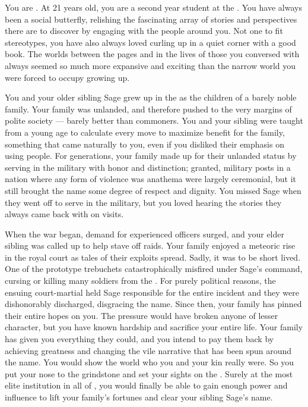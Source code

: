 \documentclass[char]{GL2020}
\begin{document}
\name{\cLibAssist{}}

You are \cLibAssist{\intro}. At 21 years old, you are a second year student at the \pSchool{}. You have always been a social butterfly, relishing the fascinating array of stories and perspectives there are to discover by engaging with the people around you. Not one to fit stereotypes, you have also always loved curling up in a quiet corner with a good book. The worlds between the pages and in the lives of those you conversed with always seemed so much more expansive and exciting than the narrow world you were forced to occupy growing up.  

You and your older sibling Sage grew up in the \pFarm{} as the children of a barely noble family. Your family was unlanded, and therefore pushed to the very margins of polite society — barely better than commoners. You and your sibling were taught from a young age to calculate every move to maximize benefit for the family, something that came naturally to you, even if you disliked their emphasis on using people. For generations, your family made up for their unlanded status by serving in the military with honor and distinction; granted, military posts in a nation where any form of violence was anathema were largely ceremonial, but it still brought the \cLibAssist{\formal} name some degree of respect and dignity. You missed Sage when they went off to serve in the military, but you loved hearing the stories they always came back with on visits.

When the war began, demand for experienced officers surged, and your elder sibling was called up to help stave off \pShippie{} raids. Your family enjoyed a meteoric rise in the royal court as tales of their exploits spread. Sadly, it was to be short lived. One of the prototype trebuchets catastrophically misfired under Sage’s command, cursing or killing many soldiers from the \pTech{}. For purely political reasons, the ensuing court-martial held Sage responsible for the entire incident and they were dishonorably discharged, disgracing the \cLibAssist{\formal} name. Since then, your family has pinned their entire hopes on you. The pressure would have broken anyone of lesser character, but you have known hardship and sacrifice your entire life. Your family has given you everything they could, and you intend to pay them back by achieving greatness and changing the vile narrative that has been spun around the \cLibAssist{\formal} name. You would show the world who you and your kin really were. So you put your nose to the grindstone and set your sights on the \pSchool{}. Surely at the most elite institution in all of \pEarth{}, you would finally be able to gain enough power and influence to lift your family’s fortunes and clear your sibling Sage’s name.
\end{document}
